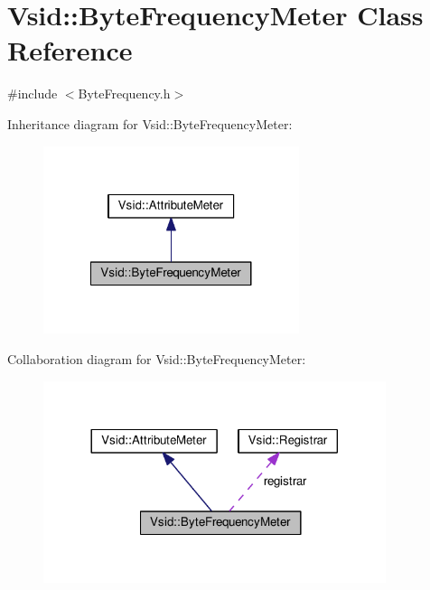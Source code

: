 \hypertarget{class_vsid_1_1_byte_frequency_meter}{\section{Vsid\-:\-:Byte\-Frequency\-Meter Class Reference}
\label{class_vsid_1_1_byte_frequency_meter}
}


{\ttfamily \#include $<$Byte\-Frequency.\-h$>$}



Inheritance diagram for Vsid\-:\-:Byte\-Frequency\-Meter\-:
\nopagebreak
\begin{figure}[H]
\begin{center}
\leavevmode
\includegraphics[width=212pt]{class_vsid_1_1_byte_frequency_meter__inherit__graph}
\end{center}
\end{figure}


Collaboration diagram for Vsid\-:\-:Byte\-Frequency\-Meter\-:
\nopagebreak
\begin{figure}[H]
\begin{center}
\leavevmode
\includegraphics[width=284pt]{class_vsid_1_1_byte_frequency_meter__coll__graph}
\end{center}
\end{figure}

